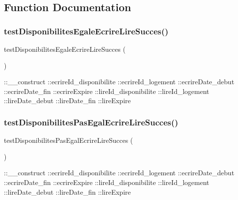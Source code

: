 \subsection{Function Documentation}
\mbox{\label{_disponibilites_test_8php_accbf3d4614e28a843c699d4c7c9f867c}} 
\subsubsection{\texorpdfstring{test\+Disponibilites\+Egale\+Ecrire\+Lire\+Succes()}{testDisponibilitesEgaleEcrireLireSucces()}}
{\footnotesize\ttfamily test\+Disponibilites\+Egale\+Ecrire\+Lire\+Succes (\begin{DoxyParamCaption}{ }\end{DoxyParamCaption})}

\+::\+\_\+\+\_\+construct  \+::ecrire\+Id\+\_\+disponibilite  \+::ecrire\+Id\+\_\+logement  \+::ecrire\+Date\+\_\+debut  \+::ecrire\+Date\+\_\+fin  \+::ecrire\+Expire  \+::lire\+Id\+\_\+disponibilite  \+::lire\+Id\+\_\+logement  \+::lire\+Date\+\_\+debut  \+::lire\+Date\+\_\+fin  \+::lire\+Expire \mbox{\label{_disponibilites_test_8php_ac1bc1493d900e5f0985b18d8c8d0b62a}} 
\subsubsection{\texorpdfstring{test\+Disponibilites\+Pas\+Egal\+Ecrire\+Lire\+Succes()}{testDisponibilitesPasEgalEcrireLireSucces()}}
{\footnotesize\ttfamily test\+Disponibilites\+Pas\+Egal\+Ecrire\+Lire\+Succes (\begin{DoxyParamCaption}{ }\end{DoxyParamCaption})}

\+::\+\_\+\+\_\+construct  \+::ecrire\+Id\+\_\+disponibilite  \+::ecrire\+Id\+\_\+logement  \+::ecrire\+Date\+\_\+debut  \+::ecrire\+Date\+\_\+fin  \+::ecrire\+Expire  \+::lire\+Id\+\_\+disponibilite  \+::lire\+Id\+\_\+logement  \+::lire\+Date\+\_\+debut  \+::lire\+Date\+\_\+fin  \+::lire\+Expire 